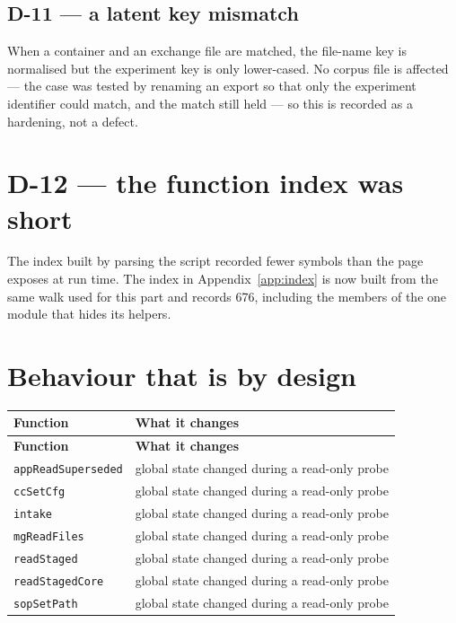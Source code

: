 \subsection*{D-11 --- a latent key mismatch}
When a container and an exchange file are matched, the file-name key is normalised
but the experiment key is only lower-cased. No corpus file is affected --- the case
was tested by renaming an export so that only the experiment identifier could match,
and the match still held --- so this is recorded as a hardening, not a defect.

\section{D-12 --- the function index was short}
The index built by parsing the script recorded fewer symbols than the page exposes
at run time. The index in Appendix~\ref{app:index} is now built from the same walk
used for this part and records 676, including the members of the one module that
hides its helpers.

\section{Behaviour that is by design}

{\small
\begin{xltabular}{\linewidth}{|X|l|}
\toprule \textbf{Function} & \textbf{What it changes} \\\midrule\endfirsthead
\toprule \textbf{Function} & \textbf{What it changes} \\\midrule\endhead
\texttt{appReadSuperseded} & global state changed during a read-only probe \\
\texttt{ccSetCfg} & global state changed during a read-only probe \\
\texttt{intake} & global state changed during a read-only probe \\
\texttt{mgReadFiles} & global state changed during a read-only probe \\
\texttt{readStaged} & global state changed during a read-only probe \\
\texttt{readStagedCore} & global state changed during a read-only probe \\
\texttt{sopSetPath} & global state changed during a read-only probe \\
\bottomrule
\end{xltabular}}

